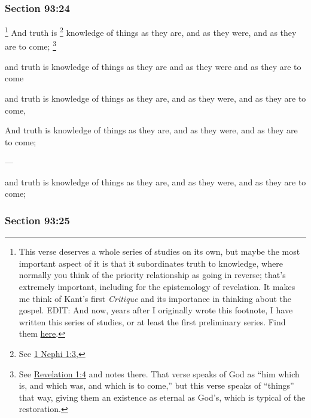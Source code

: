 	\subsubsection{Section 93:24} %
		\label{DC93-24}

			\footnote{%
				This verse deserves a whole series of studies on its own, but maybe the most important aspect of it is that it subordinates truth to knowledge, where normally you think of the priority relationship as going in reverse; that's extremely important, including for the epistemology of revelation. It makes me think of Kant's first \textit{Critique} and its importance in thinking about the gospel. EDIT: And now, years after I originally wrote this footnote, I have written this series of studies, or at least the first preliminary series. Find them \href{https://docs.google.com/document/d/1Skh5HA1vFgllloVAObrsPw6zufYDzGo_C-vdkToHbGw/edit\#heading=h.c59zktk9yl84}{here}.
				}%
		And truth is
			\footnote{%
				See \hyperref[1NEPHI-1-3]{1 Nephi 1:3}, 
				}%
		knowledge of things as they are, and as they were, and as they are to come;%
			\footnote{%
				See \hyperref[REVELATIONNT-1-4]{Revelation 1:4} and notes there. That verse speaks of God as ``him which is, and which was, and which is to come,'' but this verse speaks of ``things'' that way, giving them an existence as eternal as God's, which is typical of the restoration.
				}

		\begin{framed}
		\scriptsize
			\begin{compactdesc}
				\item[JSP] and truth is knowledge of things as they are and as they were and as they are to come
				\item[RB2] and truth is knowledge of things as they are, and as they were, and as they are to come, 
				\item[RB1] And truth is knowledge of things as they are, and as they were, and as they are to come;
				\item[BC] ---
				\item[DC 1835] and truth is knowledge of things as they are, and as they were, and as they are to come;
			\end{compactdesc}
		\end{framed}

	\subsubsection{Section 93:25} %
		\label{DC93-25}

